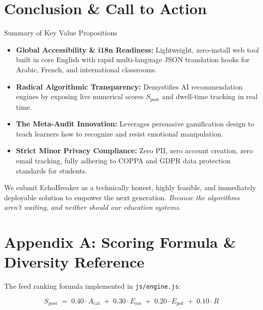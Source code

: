 \documentclass[11pt, a4paper]{article}
\begin{document}
\section{Conclusion \& Call to Action}

\begin{honestbox}{Summary of Key Value Propositions}
\begin{itemize}[noitemsep,topsep=2pt]
    \item \textbf{Global Accessibility \& i18n Readiness:} Lightweight, zero-install web tool built in core English with rapid multi-language JSON translation hooks for Arabic, French, and international classrooms.
    \item \textbf{Radical Algorithmic Transparency:} Demystifies AI recommendation engines by exposing live numerical scores $S_{\text{post}}$ and dwell-time tracking in real time.
    \item \textbf{The Meta-Audit Innovation:} Leverages persuasive gamification design to teach learners how to recognize and resist emotional manipulation.
    \item \textbf{Strict Minor Privacy Compliance:} Zero PII, zero account creation, zero email tracking, fully adhering to COPPA and GDPR data protection standards for students.
\end{itemize}

\vspace{6pt}
We submit EchoBreaker as a technically honest, highly feasible, and immediately deployable solution to empower the next generation. \textit{Because the algorithms aren't waiting, and neither should our education systems.}
\end{honestbox}

\appendix

\section*{Appendix A: Scoring Formula \& Diversity Reference}

The feed ranking formula implemented in \texttt{js/engine.js}:

\[
  S_{\text{post}} \;=\;
    0.40 \cdot A_{\text{cat}}
    \;+\; 0.30 \cdot E_{\text{res}}
    \;+\; 0.20 \cdot E_{\text{pot}}
    \;+\; 0.10 \cdot R
\]
\end{document}
